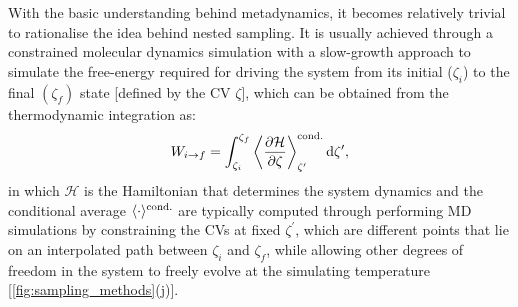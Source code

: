 
With the basic understanding behind metadynamics, it becomes relatively trivial to rationalise the idea behind  nested sampling. It is  usually achieved through a constrained molecular dynamics simulation with a slow-growth approach\cite{woo1997combined,jarzynski1997nonequilibrium} to simulate the free-energy required for driving the system from its initial ($\zeta_i$) to the final $(\zeta_f)$ state  [defined by the CV $\zeta$], which can be obtained from the thermodynamic integration as:\cite{sprik1998free}
\begin{equation}
    \label{eq:thermodynamic_integration}
    W_{i\to f}=\int_{\zeta_i}^{\zeta_f}\left\langle \frac{\partial \mathcal{H}}{\partial \zeta}\right\rangle_{\zeta^\prime}^{\mbox{\scriptsize{cond.}}} \mbox{d}\zeta^\prime ,
\end{equation}
in which $\mathcal{H}$ is the Hamiltonian that determines the system dynamics and the conditional average $\langle\cdot\rangle^{\mbox{\scriptsize{cond.}}}$ are typically computed through performing MD simulations by constraining the CVs at  fixed $\zeta^\prime$, which are different points that lie on an interpolated path between $\zeta_i$ and $\zeta_f$, while allowing other degrees of freedom in the system to freely evolve at the simulating temperature [\cref{fig:sampling_methods}(j)]. 
